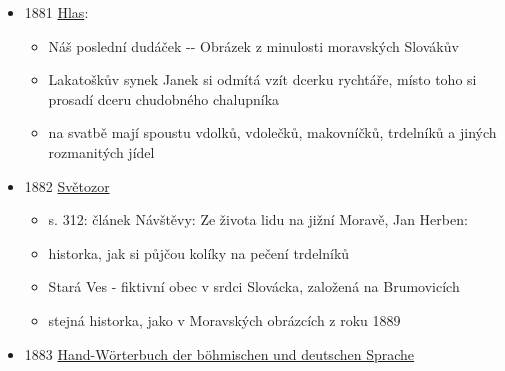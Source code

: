 \begin{itemize}
  \begin{itemize}
  \tightlist
  \item
    František Štěpán Kott
  \item
    heslo Pletenec:

    \begin{itemize}
    \tightlist
    \item
      Pletenec, nce, pletének, nku, m., pletený koláč, věnec, pečivo, na
      Mor. trdelník, (Bž.), šestinedělkám do kouta posílané, calta,
      kolenč, Kranzsemmel, Flechte, f., geflochtener Kuchen, Strizel, m.
      -\/- P., koš. Plk. -\/- P. bavlněný, Baumwollzopf, m. Dch. -\/- P.
      fíků, Feigenbündel, n. Mřk.
    \item
      v jinejch zdrojích je pletenec spíš vánočka, takže to vypadá na
      omyl
    \end{itemize}
  \item
    heslo Nalévanec:

    \begin{itemize}
    \tightlist
    \item
      Nalévanec, nce, m. vaječník, eine Mehlspeise. Na Mor.
    \item
      Mehlspeise znamená moučník
    \item
      zní to jako prugelkrapfen? Ale taky to může bejt lívanec.
    \end{itemize}
  \end{itemize}
\item
  1881
  \href{https://www.digitalniknihovna.cz/vkol/uuid/uuid:ee6aa277-be90-45f6-92d6-aa32dbd0464c}{Hlas}:

  \begin{itemize}
  \tightlist
  \item
    Náš poslední dudáček -\/- Obrázek z minulosti moravských Slovákův
  \item
    Lakatoškův synek Janek si odmítá vzít dcerku rychtáře, místo toho si
    prosadí dceru chudobného chalupníka
  \item
    na svatbě mají spoustu vdolků, vdolečků, makovníčků, trdelníků a
    jiných rozmanitých jídel
  \end{itemize}
\item
  1882
  \href{https://ceskadigitalniknihovna.cz/uuid/uuid:ee6245d1-435d-11dd-b505-00145e5790ea}{Světozor}

  \begin{itemize}
  \tightlist
  \item
    s. 312: článek Návštěvy: Ze života lidu na jižní Moravě, Jan Herben:
  \item
    historka, jak si půjčou kolíky na pečení trdelníků
  \item
    Stará Ves - fiktivní obec v srdci Slovácka, založená na Brumovicích
  \item
    stejná historka, jako v Moravských obrázcích z roku 1889
  \end{itemize}
\item
  1883
  \href{https://www.google.cz/books/edition/Hand_W\%C3\%B6rterbuch_der_b\%C3\%B6hmischen_und_deu/c6KWlveere4C?hl=cs&gbpv=1&dq=trdeln\%C3\%ADk&pg=PA452&printsec=frontcover}{Hand-Wörterbuch
  der böhmischen und deutschen Sprache }


\end{itemize}
